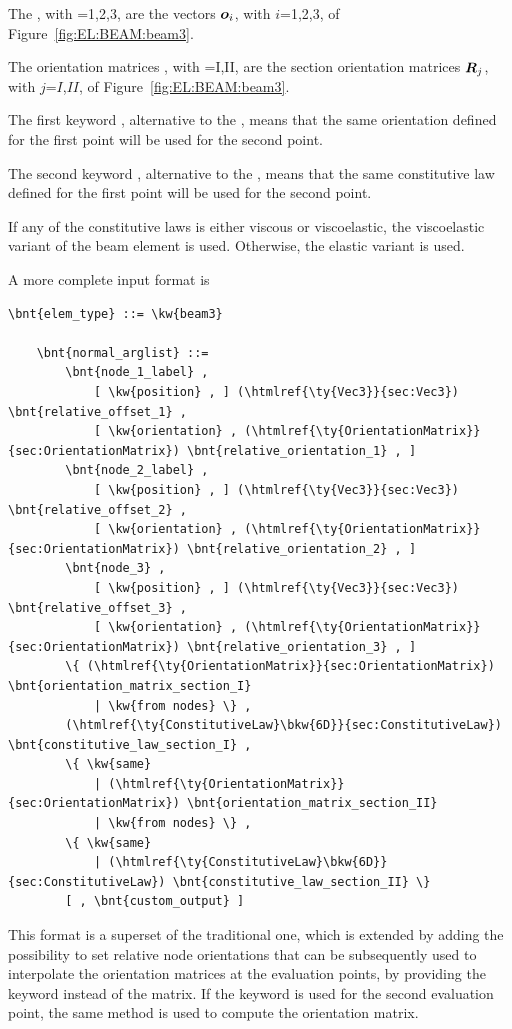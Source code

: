 The , with =1,2,3, are the vectors
$\boldsymbol{o}_i$, with $i$=1,2,3, of Figure~\ref{fig:EL:BEAM:beam3}.

The orientation matrices ,
with =I,II, are the section orientation matrices
$\boldsymbol{R}_j$, with $j$=$I$,$II$, of Figure~\ref{fig:EL:BEAM:beam3}.

The first keyword , alternative to the 
, means that the same orientation
defined for the first point will be used for the second point.

The second keyword , alternative to the
, means that the same constitutive law
defined for the first point will be used for the second point.

If any of the constitutive laws is either viscous or viscoelastic,
the viscoelastic variant of the beam element is used.
Otherwise, the elastic variant is used.

A more complete input format is
\begin{Verbatim}[commandchars=\\\{\}]
    \bnt{elem_type} ::= \kw{beam3}

    \bnt{normal_arglist} ::=
        \bnt{node_1_label} ,
            [ \kw{position} , ] (\htmlref{\ty{Vec3}}{sec:Vec3}) \bnt{relative_offset_1} ,
            [ \kw{orientation} , (\htmlref{\ty{OrientationMatrix}}{sec:OrientationMatrix}) \bnt{relative_orientation_1} , ]
        \bnt{node_2_label} ,
            [ \kw{position} , ] (\htmlref{\ty{Vec3}}{sec:Vec3}) \bnt{relative_offset_2} ,
            [ \kw{orientation} , (\htmlref{\ty{OrientationMatrix}}{sec:OrientationMatrix}) \bnt{relative_orientation_2} , ]
        \bnt{node_3} ,
            [ \kw{position} , ] (\htmlref{\ty{Vec3}}{sec:Vec3}) \bnt{relative_offset_3} ,
            [ \kw{orientation} , (\htmlref{\ty{OrientationMatrix}}{sec:OrientationMatrix}) \bnt{relative_orientation_3} , ]
        \{ (\htmlref{\ty{OrientationMatrix}}{sec:OrientationMatrix}) \bnt{orientation_matrix_section_I}
            | \kw{from nodes} \} ,
        (\htmlref{\ty{ConstitutiveLaw}\bkw{6D}}{sec:ConstitutiveLaw}) \bnt{constitutive_law_section_I} ,
        \{ \kw{same}
            | (\htmlref{\ty{OrientationMatrix}}{sec:OrientationMatrix}) \bnt{orientation_matrix_section_II}
            | \kw{from nodes} \} ,
        \{ \kw{same}
            | (\htmlref{\ty{ConstitutiveLaw}\bkw{6D}}{sec:ConstitutiveLaw}) \bnt{constitutive_law_section_II} \}
        [ , \bnt{custom_output} ]
\end{Verbatim}
This format is a superset of the traditional one, which is extended
by adding the possibility to set relative node orientations
that can be subsequently used to interpolate the orientation matrices
at the evaluation points, by providing the keyword 
instead of the matrix.
If the keyword  is used for the second evaluation point,
the same method is used to compute the orientation matrix.

